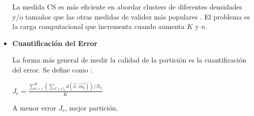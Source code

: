 \begin{itemize}
La medida CS es más eficiente en abordar clusters de diferentes densidades y/o
tamaños que las otras medidas de validez más populares \cite{DC_6}. El problema
es la carga computacional que incrementa cuando aumenta $K$ y $n$.

\item {\bf Cuantificación del Error}

    La forma más general de medir la calidad de la partición es la cuantificación 
del error. Se define como \cite{PSO_0}:
\begin{center}
$J_e = \displaystyle\frac{\displaystyle\sum_{k = 1}^K \left( \displaystyle\sum_{\overrightarrow{x} \in C_k} d(\overrightarrow{x}, \overrightarrow{m_k}) \right) / N_k}{K}$
\end{center}

A menor error $J_e$, mejor partición.

\end{itemize}
